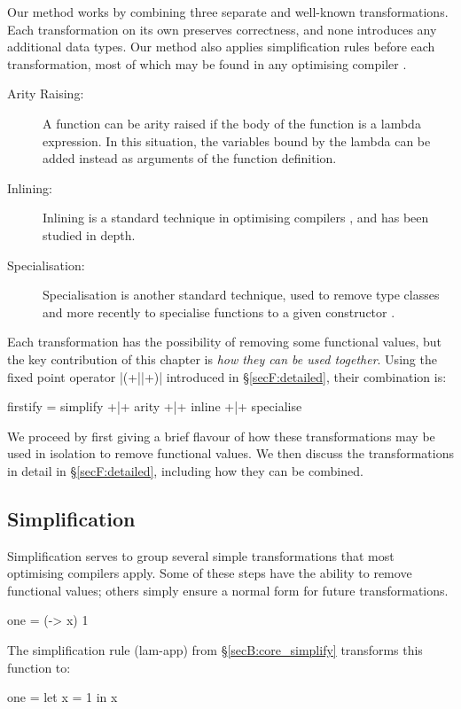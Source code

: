 Our method works by combining three separate and well-known transformations. Each transformation on its own preserves correctness, and none introduces any additional data types. Our method also applies simplification rules before each transformation, most of which may be found in any optimising compiler \cite{spj:transformation}.

\begin{description}
\item[Arity Raising:] A function can be arity raised if the body of the function is a lambda expression. In this situation, the variables bound by the lambda can be added instead as arguments of the function definition.
\item[Inlining:] Inlining is a standard technique in optimising compilers \cite{spj:inlining}, and has been studied in depth.
\item[Specialisation:] Specialisation is another standard technique, used to remove type classes \cite{jones:dictionary_free} and more recently to specialise functions to a given constructor \cite{spj:specconstr}.
\end{description}

Each transformation has the possibility of removing some functional values, but the key contribution of this chapter is \textit{how they can be used together}. Using the fixed point operator |(+||+)| introduced in \S\ref{secF:detailed}, their combination is:

\begin{code}
firstify = simplify +|+ arity +|+ inline +|+ specialise
\end{code}

We proceed by first giving a brief flavour of how these transformations may be used in isolation to remove functional values. We then discuss the transformations in detail in \S\ref{secF:detailed}, including how they can be combined.

\subsection{Simplification}

Simplification serves to group several simple transformations that most optimising compilers apply. Some of these steps have the ability to remove functional values; others simply ensure a normal form for future transformations.

\begin{example}
\begin{code}
one = (\x -> x) 1
\end{code}

\noindent The simplification rule (lam-app) from \S\ref{secB:core_simplify} transforms this function to:

\begin{code}
one = let x = 1 in x
\end{code}
\end{example}

